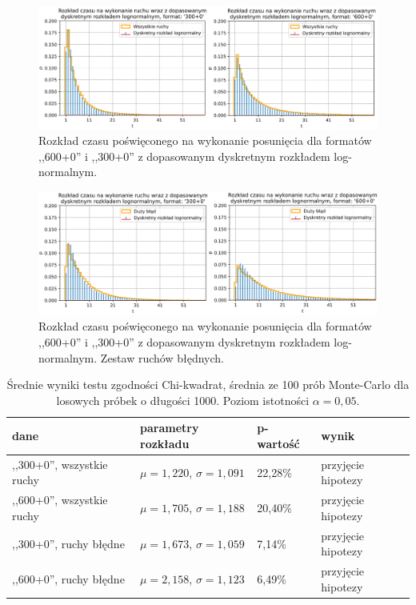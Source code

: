 \documentclass[inzynierska]{pwr_wmat_praca_dyplomowa}
\theoremstyle{plain}
\numberwithin{theorem}{chapter}
\theoremstyle{definition}
\numberwithin{theorem}{chapter}
\begin{document}
\begin{figure}[h]
	\centering
	\includegraphics[width=\textwidth]{discrete_lognorm_1.png}
	\caption{Rozkład czasu poświęconego na wykonanie posunięcia dla formatów ,,600+0'' i ,,300+0'' z dopasowanym dyskretnym rozkładem log-normalnym.}
	\label{rys:lognorm_disc}
\end{figure}
\begin{figure}[h]
	\centering
	\includegraphics[width=\textwidth]{discrete_lognorm_2.png}
	\caption{Rozkład czasu poświęconego na wykonanie posunięcia dla formatów ,,600+0'' i ,,300+0'' z dopasowanym dyskretnym rozkładem log-normalnym. Zestaw ruchów błędnych.}
	\label{rys:lognorm2_disc}
\end{figure}

\begin{table}[h]
	\caption{Średnie wyniki testu zgodności Chi-kwadrat, średnia ze 100 prób Monte-Carlo dla losowych próbek o długości 1000. Poziom istotności $\alpha = 0,05$.}
	\centering
	\begin{tabular}{|l|l|l|l|}
		\hline
		\textbf{dane}                     & \textbf{parametry rozkładu}& \textbf{p-wartość} & \textbf{wynik}     \\ \hline
		,,300+0'', wszystkie ruchy & $\mu = 1,220$, $\sigma = 1,091$& 22,28\%                    & przyjęcie hipotezy \\ \hline
		,,600+0'', wszystkie ruchy & $\mu = 1,705$, $\sigma = 1,188$& 20,40\%                    & przyjęcie hipotezy \\ \hline
		,,300+0'', ruchy błędne    & $\mu = 1,673$, $\sigma = 1,059$& 7,14\%                     & przyjęcie hipotezy \\ \hline
		,,600+0'', ruchy błędne    & $\mu = 2,158$, $\sigma = 1,123$& 6,49\%                     & przyjęcie hipotezy \\ \hline
	\end{tabular}
	\label{tab:testy} 
\end{table}
\end{document}
